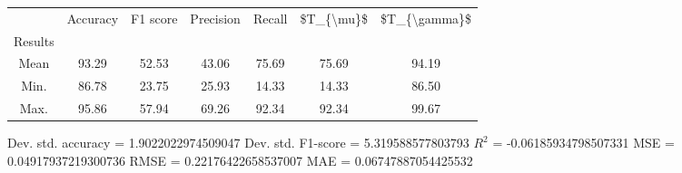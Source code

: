 \begin{tabular}{|c|c|c|c|c|c|c|}
\toprule
{} &  Accuracy &  F1 score &  Precision &  Recall &  \$T\_\{\textbackslash mu\}\$ &  \$T\_\{\textbackslash gamma\}\$ \\
Results &           &           &            &         &            &               \\
\hline
Mean    &     93.29 &     52.53 &      43.06 &   75.69 &      75.69 &         94.19 \\
Min.    &     86.78 &     23.75 &      25.93 &   14.33 &      14.33 &         86.50 \\
Max.    &     95.86 &     57.94 &      69.26 &   92.34 &      92.34 &         99.67 \\
\bottomrule
\end{tabular}

 Dev. std. accuracy = 1.9022022974509047
 Dev. std. F1-score = 5.319588577803793
 $R^2$ = -0.06185934798507331
 MSE = 0.04917937219300736
 RMSE = 0.22176422658537007
 MAE = 0.06747887054425532